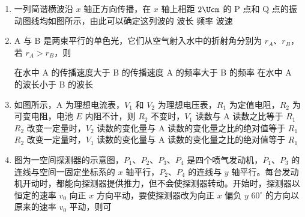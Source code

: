 \documentclass[\gkver]{gaokaozhenti}
\begin{document}
\begin{enumerate}
\item
一列简谐横波沿 $x$ 轴正方向传播，在 $x$ 轴上相距 $2\Ucm$ 的 P 点和 Q 点的振动图线均如图所示，由此可以确定这列波的 
{波长}
{频率}
{波速}


\item
A 与 B 是两束平行的单色光，它们从空气射入水中的折射角分别为 $r_{A}$、$r_{B}$，若 $r_{A} > r_{B}$，则 

{在水中 A 的传播速度大于 B 的传播速度}
{A 的频率大于 B 的频率}
{在水中 A 的波长小于 B 的波长}


\item
如图所示，A 为理想电流表，$V_{1}$ 和 $V_{2}$ 为理想电压表，$R_{1}$ 为定值电阻，$R_{2}$ 为可变电阻，电池 $E$ 内阻不计，则 
\onepicture[w=4.31cm]{}
{$R_{2}$ 不变时，$V_{1}$ 读数与 A 读数之比等于 $R_{1}$}
{$R_{2}$ 改变一定量时，$V_{2}$ 读数的变化量与 A 读数的变化量之比的绝对值等于 $R_{1}$}
{$R_{2}$ 改变一定量时，$V_{1}$ 读数的变化量与 A 读数的变化量之比的绝对值等于 $R_{1}$}


\item
图为一空间探测器的示意图，$P_{1}$、$P_{2}$、$P_{3}$、$P_{4}$ 是四个喷气发动机，$P_{1}$、$P_{3}$ 的连线与空间一固定坐标系的 $x$ 轴平行，$P_{2}$、$P_{4}$ 的连线与 $y$ 轴平行。每台发动机开动时，都能向探测器提供推力，但不会使探测器转动。开始时，探测器以恒定的速率 $v_{0}$ 向正 $x$ 方向平动，要使探测器改为向正 $x$ 偏负 $y$ $60^\circ$ 的方向以原来的速率 $v_{0}$ 平动，则可 
\onepicture[w=6.63cm]{}


\end{enumerate}
\end{document}
